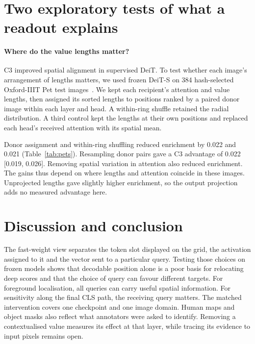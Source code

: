 \section{Two exploratory tests of what a readout explains}
\paragraph{Where do the value lengths matter?} C3 improved spatial alignment in supervised DeiT. To test whether each image's arrangement of lengths matters, we used frozen DeiT-S on 384 hash-selected Oxford-IIIT Pet test images~\citep{parkhi2012pets}. We kept each recipient's attention and value lengths, then assigned its sorted lengths to positions ranked by a paired donor image within each layer and head. A within-ring shuffle retained the radial distribution. A third control kept the lengths at their own positions and replaced each head's received attention with its spatial mean.

\begin{center}\begin{minipage}{\linewidth}
\label{tab:pets}\centering\small\setlength{\tabcolsep}{5pt}

\end{minipage}\end{center}

Donor assignment and within-ring shuffling reduced enrichment by 0.022 and 0.021 (Table~\ref{tab:pets}). Resampling donor pairs gave a C3 advantage of 0.022 [0.019, 0.026]. Removing spatial variation in attention also reduced enrichment. The gains thus depend on where lengths and attention coincide in these images. Unprojected lengths gave slightly higher enrichment, so the output projection adds no measured advantage here.


\section{Discussion and conclusion}
The fast-weight view separates the token slot displayed on the grid, the activation assigned to it and the vector sent to a particular query. Testing those choices on frozen models shows that decodable position alone is a poor basis for relocating deep scores and that the choice of query can favour different targets. For foreground localisation, all queries can carry useful spatial information. For sensitivity along the final CLS path, the receiving query matters. The matched intervention covers one checkpoint and one image domain. Human maps and object masks also reflect what annotators were asked to identify. Removing a contextualised value measures its effect at that layer, while tracing its evidence to input pixels remains open.
